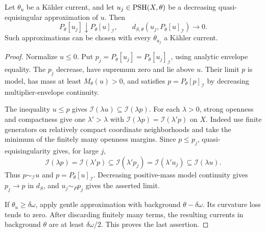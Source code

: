 \begin{proposition}\label{prop:analytic-regularizations-limit-at-multiplier-envelope}
Let $\theta_u$ be a K\"ahler current, and let $u_j\in\mathrm{PSH}(X,\theta)$ be a decreasing quasi-equisingular approximation of $u$. Then
\[
 P_\theta[u_j]\downarrow P_\theta[u]_{\mathcal I},\qquad
 d_{S,\theta}(u_j,P_\theta[u]_{\mathcal I})\longrightarrow0.
\]
Such approximations can be chosen with every $\theta_{u_j}$ a K\"ahler current.
\end{proposition}
\begin{proof}
Normalize $u\leq0$. Put $p_j=P_\theta[u_j]=P_\theta[u_j]_{\mathcal I}$, using analytic envelope equality. The $p_j$ decrease, have supremum zero and lie above $u$. Their limit $p$ is model, has mass at least $M_\theta(u)>0$, and satisfies $p=P_\theta[p]_{\mathcal I}$ by decreasing multiplier-envelope continuity.

The inequality $u\leq p$ gives $\mathcal I(\lambda u)\subseteq\mathcal I(\lambda p)$. For each $\lambda>0$, strong openness and compactness give one $\lambda'>\lambda$ with $\mathcal I(\lambda p)=\mathcal I(\lambda'p)$ on $X$. Indeed use finite generators on relatively compact coordinate neighborhoods and take the minimum of the finitely many openness margins. Since $p\leq p_j$, quasi-equisingularity gives, for large $j$,
\[
 \mathcal I(\lambda p)=\mathcal I(\lambda'p)
     \subseteq\mathcal I(\lambda'p_j)
     =\mathcal I(\lambda'u_j)\subseteq\mathcal I(\lambda u).
\]
Thus $p\sim_{\mathcal I}u$ and $p=P_\theta[u]_{\mathcal I}$. Decreasing positive-mass model continuity gives $p_j\to p$ in $d_S$, and $u_j\sim_Pp_j$ gives the asserted limit.

If $\theta_u\geq\delta\omega$, apply gentle approximation with background $\theta-\delta\omega$. Its curvature loss tends to zero. After discarding finitely many terms, the resulting currents in background $\theta$ are at least $\delta\omega/2$. This proves the last assertion.
\end{proof}

